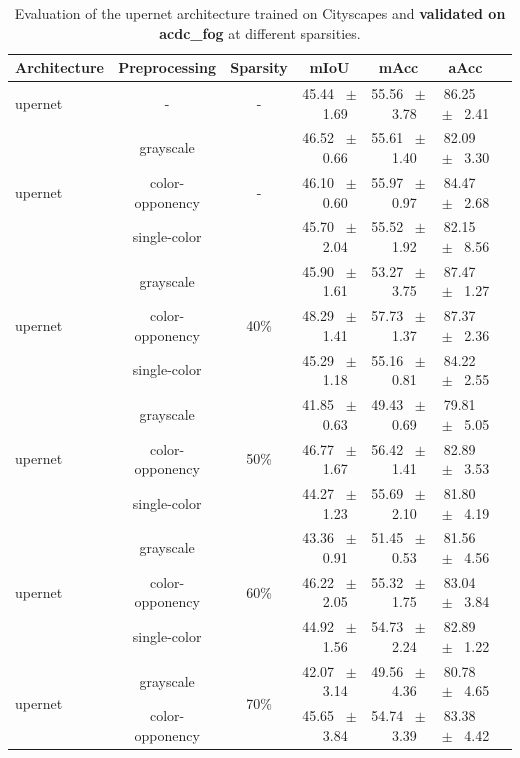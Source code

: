 \begin{table}[h]
  \centering
  \caption{Evaluation of the upernet architecture trained on Cityscapes and \textbf{validated on acdc_fog} at different sparsities.}
  \begin{tabular}{@{}lccc ccc@{}}
    \toprule
    Architecture & Preprocessing & Sparsity & mIoU & mAcc & aAcc \\
    \midrule
    upernet & - & - & 45.44 ~$\pm$~ 1.69 & 55.56 ~$\pm$~ 3.78 & 86.25 ~$\pm$~ 2.41 \\
    \midrule
    \midrule
    \multirow{3}{*}{upernet} & grayscale & \multirow{3}{*}{-} & 46.52 ~$\pm$~ 0.66 & 55.61 ~$\pm$~ 1.40 & 82.09 ~$\pm$~ 3.30 \\
    & color-opponency & & 46.10 ~$\pm$~ 0.60 & 55.97 ~$\pm$~ 0.97 & 84.47 ~$\pm$~ 2.68 \\
    & single-color & & 45.70 ~$\pm$~ 2.04 & 55.52 ~$\pm$~ 1.92 & 82.15 ~$\pm$~ 8.56 \\
    \midrule
    \multirow{3}{*}{upernet} & grayscale & \multirow{3}{*}{40\%} & 45.90 ~$\pm$~ 1.61 & 53.27 ~$\pm$~ 3.75 & 87.47 ~$\pm$~ 1.27 \\
    & color-opponency & & 48.29 ~$\pm$~ 1.41 & 57.73 ~$\pm$~ 1.37 & 87.37 ~$\pm$~ 2.36 \\
    & single-color & & 45.29 ~$\pm$~ 1.18 & 55.16 ~$\pm$~ 0.81 & 84.22 ~$\pm$~ 2.55 \\
    \midrule
    \multirow{3}{*}{upernet} & grayscale & \multirow{3}{*}{50\%} & 41.85 ~$\pm$~ 0.63 & 49.43 ~$\pm$~ 0.69 & 79.81 ~$\pm$~ 5.05 \\
    & color-opponency & & 46.77 ~$\pm$~ 1.67 & 56.42 ~$\pm$~ 1.41 & 82.89 ~$\pm$~ 3.53 \\
    & single-color & & 44.27 ~$\pm$~ 1.23 & 55.69 ~$\pm$~ 2.10 & 81.80 ~$\pm$~ 4.19 \\
    \midrule
    \multirow{3}{*}{upernet} & grayscale & \multirow{3}{*}{60\%} & 43.36 ~$\pm$~ 0.91 & 51.45 ~$\pm$~ 0.53 & 81.56 ~$\pm$~ 4.56 \\
    & color-opponency & & 46.22 ~$\pm$~ 2.05 & 55.32 ~$\pm$~ 1.75 & 83.04 ~$\pm$~ 3.84 \\
    & single-color & & 44.92 ~$\pm$~ 1.56 & 54.73 ~$\pm$~ 2.24 & 82.89 ~$\pm$~ 1.22 \\
    \midrule
    \multirow{3}{*}{upernet} & grayscale & \multirow{3}{*}{70\%} & 42.07 ~$\pm$~ 3.14 & 49.56 ~$\pm$~ 4.36 & 80.78 ~$\pm$~ 4.65 \\
    & color-opponency & & 45.65 ~$\pm$~ 3.84 & 54.74 ~$\pm$~ 3.39 & 83.38 ~$\pm$~ 4.42 \\

\end{tabular}
\end{table}
